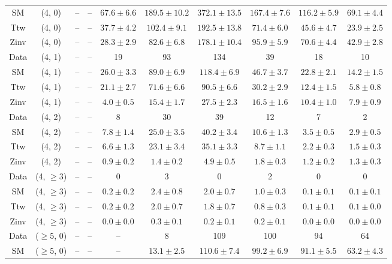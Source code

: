 \begin{table}[h!]
{\begin{tabular}{cccccccccc}
	SM & (4, 0) & -- & -- & $67.6\pm 6.6$ & $189.5\pm 10.2$ & $372.1\pm 13.5$ & $167.4\pm 7.6$ & $116.2\pm 5.9$ & $69.1\pm 4.4$ \\[0.5ex] 
	Ttw & (4, 0) & -- & -- & $37.7\pm 4.2$ & $102.4\pm 9.1$ & $192.5\pm 13.8$ & $71.4\pm 6.0$ & $45.6\pm 4.7$ & $23.9\pm 2.5$ \\[0.5ex] 
	Zinv & (4, 0) & -- & -- & $28.3\pm 2.9$ & $82.6\pm 6.8$ & $178.1\pm 10.4$ & $95.9\pm 5.9$ & $70.6\pm 4.4$ & $42.9\pm 2.8$ \\[0.5ex] 
	Data & (4, 1) & -- & -- & 19 & 93 & 134 & 39 & 18 & 10 \\[0.5ex] 
	SM & (4, 1) & -- & -- & $26.0\pm 3.3$ & $89.0\pm 6.9$ & $118.4\pm 6.9$ & $46.7\pm 3.7$ & $22.8\pm 2.1$ & $14.2\pm 1.5$ \\[0.5ex] 
	Ttw & (4, 1) & -- & -- & $21.1\pm 2.7$ & $71.6\pm 6.6$ & $90.5\pm 6.6$ & $30.2\pm 2.9$ & $12.4\pm 1.5$ & $5.8\pm 0.8$ \\[0.5ex] 
	Zinv & (4, 1) & -- & -- & $4.0\pm 0.5$ & $15.4\pm 1.7$ & $27.5\pm 2.3$ & $16.5\pm 1.6$ & $10.4\pm 1.0$ & $7.9\pm 0.9$ \\[0.5ex] 
	Data & (4, 2) & -- & -- & 8 & 30 & 39 & 12 & 7 & 2 \\[0.5ex] 
	SM & (4, 2) & -- & -- & $7.8\pm 1.4$ & $25.0\pm 3.5$ & $40.2\pm 3.4$ & $10.6\pm 1.3$ & $3.5\pm 0.5$ & $2.9\pm 0.5$ \\[0.5ex] 
	Ttw & (4, 2) & -- & -- & $6.6\pm 1.3$ & $23.1\pm 3.4$ & $35.1\pm 3.3$ & $8.7\pm 1.1$ & $2.2\pm 0.3$ & $1.5\pm 0.3$ \\[0.5ex] 
	Zinv & (4, 2) & -- & -- & $0.9\pm 0.2$ & $1.4\pm 0.2$ & $4.9\pm 0.5$ & $1.8\pm 0.3$ & $1.2\pm 0.2$ & $1.3\pm 0.3$ \\[0.5ex] 
	Data & (4, $\ge3$) & -- & -- & 0 & 3 & 0 & 2 & 0 & 0 \\[0.5ex] 
	SM & (4, $\ge3$) & -- & -- & $0.2\pm 0.2$ & $2.4\pm 0.8$ & $2.0\pm 0.7$ & $1.0\pm 0.3$ & $0.1\pm 0.1$ & $0.1\pm 0.1$ \\[0.5ex] 
	Ttw & (4, $\ge3$) & -- & -- & $0.2\pm 0.2$ & $2.0\pm 0.7$ & $1.8\pm 0.7$ & $0.8\pm 0.3$ & $0.1\pm 0.1$ & $0.1\pm 0.0$ \\[0.5ex] 
	Zinv & (4, $\ge3$) & -- & -- & $0.0\pm 0.0$ & $0.3\pm 0.1$ & $0.2\pm 0.1$ & $0.2\pm 0.1$ & $0.0\pm 0.0$ & $0.0\pm 0.0$ \\[0.5ex] 
	Data & ($\ge5$, 0) & -- & -- & -- & 8 & 109 & 100 & 94 & 64 \\[0.5ex] 
	SM & ($\ge5$, 0) & -- & -- & -- & $13.1\pm 2.5$ & $110.6\pm 7.4$ & $99.2\pm 6.9$ & $91.1\pm 5.5$ & $63.2\pm 4.3$ \\[0.5ex] 

\end{tabular}}
\end{table}
